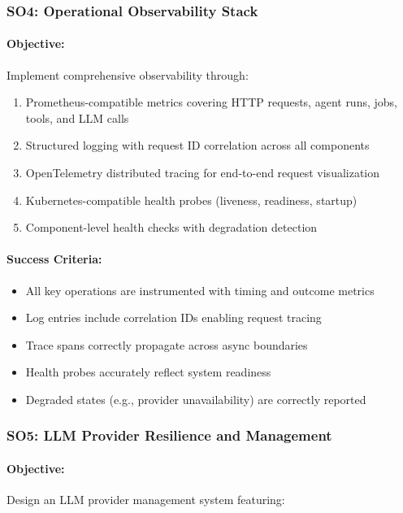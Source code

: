 \subsubsection{SO4: Operational Observability Stack}

\paragraph{Objective:} Implement comprehensive observability through:

\begin{enumerate}[label=\alph*)]
    \item Prometheus-compatible metrics covering HTTP requests, agent runs, jobs, tools, and LLM calls
    \item Structured logging with request ID correlation across all components
    \item OpenTelemetry distributed tracing for end-to-end request visualization
    \item Kubernetes-compatible health probes (liveness, readiness, startup)
    \item Component-level health checks with degradation detection
\end{enumerate}

\paragraph{Success Criteria:}
\begin{itemize}
    \item All key operations are instrumented with timing and outcome metrics
    \item Log entries include correlation IDs enabling request tracing
    \item Trace spans correctly propagate across async boundaries
    \item Health probes accurately reflect system readiness
    \item Degraded states (e.g., provider unavailability) are correctly reported
\end{itemize}

\subsubsection{SO5: LLM Provider Resilience and Management}

\paragraph{Objective:} Design an LLM provider management system featuring:

